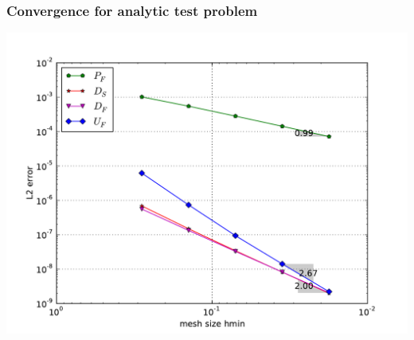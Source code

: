 \begin{frame}
  \frametitle{Convergence for analytic test problem}

  \begin{center}
    \includegraphics[width=\textwidth]{pdf/convergence1k.pdf}
  \end{center}

\end{frame}
